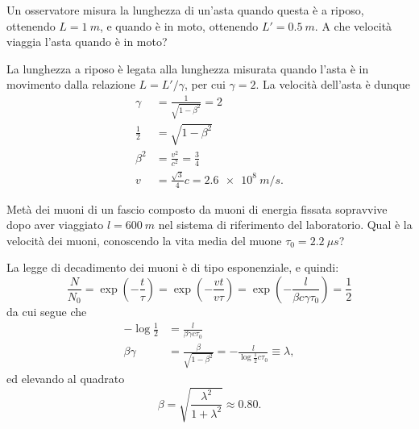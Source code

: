 \begin{Exercise}[title={Contrazione delle lunghezze}]
  Un osservatore misura la lunghezza di un'asta quando questa \`e a
  riposo, ottenendo $L=\SI{1}{m}$, e quando \`e in moto, ottenendo
  $L'=\SI{0.5}{m}$. A che velocit\`a viaggia l'asta quando \`e in moto?
\end{Exercise}
\begin{Answer}
La lunghezza a riposo \`e legata alla lunghezza misurata quando l'asta \`e
in movimento dalla relazione $L=L'/\gamma$, per cui $\gamma=2$. La
velocit\`a dell'asta \`e dunque
\begin{align*}
    \gamma &= \frac{1}{\sqrt{1-\beta^2}} = 2\\
    \frac{1}{2} &= \sqrt{1-\beta^2}\\
    \beta^2&=\frac{v^2}{c^2} = \frac{3}{4}\\
    v &= \frac{\sqrt{3}}{4}c=\SI{2.6e8}{m/s}.
\end{align*}
\end{Answer}


\begin{Exercise}[title={Decadimento e dilatazione dei tempi}]
Met\`a dei muoni di un fascio composto da muoni di energia fissata
sopravvive dopo aver viaggiato $l=\SI{600}{m}$ nel sistema di
riferimento del laboratorio. Qual è la velocità dei muoni, conoscendo la vita media del muone $\tau_0=\SI{2.2}{\mu s}$?
\end{Exercise}
\begin{Answer}
La legge di decadimento dei muoni \`e di tipo esponenziale, e quindi:
\begin{equation*}
    \frac{N}{N_0} = \exp\left(-\frac{t}{\tau}\right) = \exp\left(-\frac{vt}{v\tau}\right)=\exp\left(-\frac{l}{\beta c\gamma \tau_0}\right)=\frac{1}{2}
\end{equation*}
da cui segue che
\begin{align*}
    -\log\frac{1}{2}&=\frac{l}{\beta\gamma c\tau_0}\\
    \beta\gamma&=\frac{\beta}{\sqrt{1-\beta^2}} = -\frac{l}{\log\frac{1}{2}c\tau_0}\equiv\lambda,
\end{align*}
ed elevando al quadrato
\begin{equation*}
    \beta=\sqrt{\frac{\lambda^2}{1+\lambda^2}}\approx 0.80.
\end{equation*}
\end{Answer}


